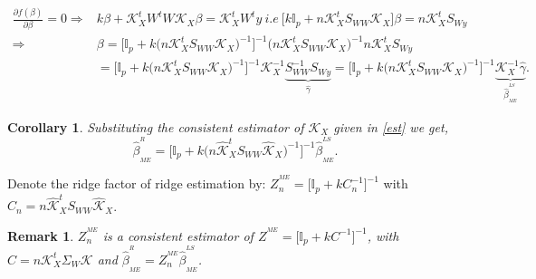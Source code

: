 \documentclass[12pt]{report}
\newtheorem{remarque}{Remark}[section]
\newtheorem{corollaire}{Corollary}
\begin{document}
\begin{align*}
	\frac{\partial f(\beta)}{\partial \beta}=0\Rightarrow & k\beta +\mathcal{K}_{X}^{t}W^{t}W\mathcal{K}_{X}\beta=\mathcal{K}_{X}^{t}W^{t}y\ i.e\ \big[k\mathbb{I}_{p}+n\mathcal{K}_{X}^{t}S_{WW}\mathcal{K}_{X}\big]\beta=n\mathcal{K}_{X}^{t}S_{Wy}\\
	\Rightarrow & \beta=\bigg[\mathbb{I}_{p}+k\big(n\mathcal{K}_{X}^{t}S_{WW}\mathcal{K}_{X}\big)^{-1}\bigg]^{-1}\big(n\mathcal{K}_{X}^{t}S_{WW}\mathcal{K}_{X}\big)^{-1}n\mathcal{K}_{X}^{t}S_{Wy}\\
	&=\bigg[\mathbb{I}_{p}+k\big(n\mathcal{K}_{X}^{t}S_{WW}\mathcal{K}_{X}\big)^{-1}\bigg]^{-1}\mathcal{K}_{X}^{-1} \underbrace{S_{WW}^{-1}S_{Wy}}_{\hat{\gamma}}=\bigg[\mathbb{I}_{p}+k\big(n\mathcal{K}_{X}^{t}S_{WW}\mathcal{K}_{X}\big)^{-1}\bigg]^{-1} \underbrace{\mathcal{K}_{X}^{-1}\hat{\gamma}}_{\hat{\beta}^{^{LS}}_{_{ME}}}.
\end{align*}

\begin{corollaire}
	Substituting the consistent estimator of $\mathcal{K}_{X}$ given in \eqref{est} we get,
	\begin{equation}
		\hat{\beta}^{^{R}}_{_{ME}}=\bigg[\mathbb{I}_{p}+k\big(n\hat{\mathcal{K}}_{X}^{t}S_{WW}\hat{\mathcal{K}}_{X}\big)^{-1}\bigg]^{-1}\hat{\beta}^{^{LS}}_{_{ME}}.
		\label{f59}
	\end{equation}
\end{corollaire}
Denote the ridge factor of ridge estimation by: $Z^{^{ME}}_{n}=\big[\mathbb{I}_{p}+kC_{n}^{-1}\big]^{-1}$ with   $C_{n}=n\hat{\mathcal{K}}_{X}^{t}S_{WW}\hat{\mathcal{K}}_{X}$.
\begin{remarque}
	$Z^{^{ME}}_{n}$ is a consistent estimator of $Z^{^{ME}}=\big[\mathbb{I}_{p}+kC^{-1}\big]^{-1}$, with  $C=n\mathcal{K}_{X}^{t}\Sigma_{W}\mathcal{K}$ and $ 	\hat{\beta}^{^{R}}_{_{ME}}=Z^{^{ME}}_{n}\hat{\beta}^{^{LS}}_{_{ME}}$.
\end{remarque}
\end{document}
